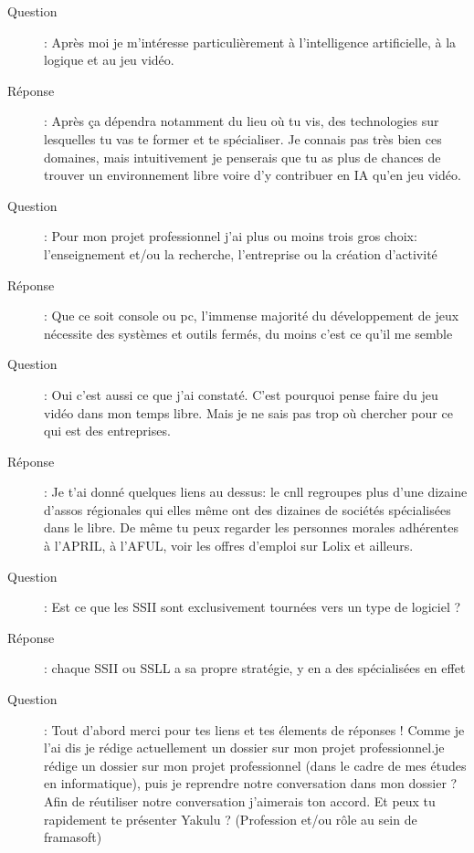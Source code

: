 \documentclass[a4paper,12pt, draft]{report}
\begin{document}
\begin{description}
\item [Question]:  Après moi je m'intéresse particulièrement à l'intelligence artificielle, à la logique et au jeu vidéo.
\item [Réponse]:  Après ça dépendra notamment du lieu où tu vis, des technologies sur lesquelles tu vas te former et te spécialiser. Je connais pas très bien ces domaines, mais intuitivement je penserais que tu as plus de chances de trouver un environnement libre voire d'y contribuer en IA qu'en jeu vidéo.
\item [Question]:  Pour mon projet professionnel j'ai plus ou moins trois gros choix: l'enseignement et/ou la recherche, l'entreprise ou la création d'activité 
\item [Réponse]:  Que ce soit console ou pc, l'immense majorité du développement de jeux nécessite des systèmes et outils fermés, du moins c'est ce qu'il me semble
\item [Question]:  Oui c'est aussi ce que j'ai constaté. C'est pourquoi pense faire du jeu vidéo dans mon temps libre. Mais je ne sais pas trop où chercher pour ce qui est des entreprises.
\item [Réponse]:  Je t'ai donné quelques liens au dessus: le cnll regroupes plus d'une dizaine d'assos régionales qui elles même ont des dizaines de sociétés spécialisées dans le libre. De même tu peux regarder les personnes morales adhérentes à l'APRIL, à l'AFUL, voir les offres d'emploi sur Lolix et ailleurs.

\item [Question]:  Est ce que les SSII sont exclusivement tournées vers un type de logiciel ?
\item [Réponse]:  chaque SSII ou SSLL a sa propre stratégie, y en a des spécialisées en effet
\item [Question]: Tout d'abord merci pour tes liens et tes élements de réponses ! Comme je l'ai dis je rédige actuellement un dossier sur mon projet professionnel.je rédige un dossier sur mon projet professionnel (dans le cadre de mes études en informatique), puis je reprendre notre conversation dans mon dossier ?  Afin de réutiliser notre conversation j'aimerais ton accord. Et peux tu rapidement te présenter Yakulu ? (Profession et/ou rôle au sein de framasoft)


\end{description}
\end{document}

